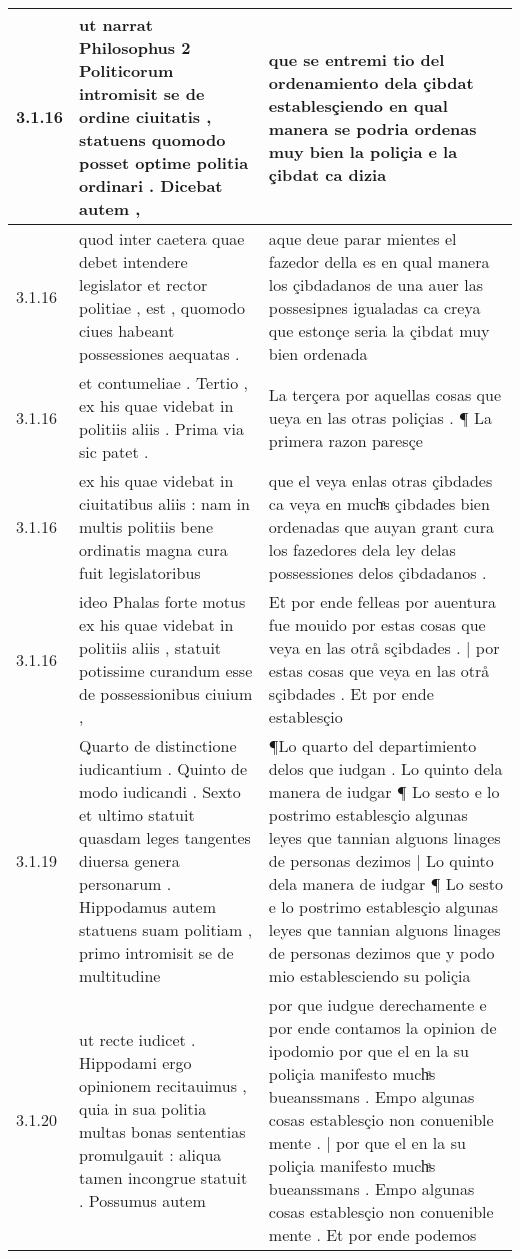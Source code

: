\begin{tabular}{|p{1cm}|p{6.5cm}|p{6.5cm}|}
3.1.16 & ut narrat Philosophus 2 Politicorum intromisit se de ordine ciuitatis , statuens quomodo posset optime politia ordinari . Dicebat autem , & que se entremi tio del ordenamiento dela çibdat establesçiendo en qual manera se podria ordenas muy bien la poliçia e la çibdat ca dizia \\\hline
3.1.16 & quod inter caetera quae debet intendere legislator et rector politiae , est , quomodo ciues habeant possessiones aequatas . & aque deue parar mientes el fazedor della es en qual manera los çibdadanos de una auer las possesipnes igualadas ca creya que estonçe seria la çibdat muy bien ordenada \\\hline
3.1.16 & et contumeliae . Tertio , ex his quae videbat in politiis aliis . Prima via sic patet . & La terçera por aquellas cosas que ueya en las otras poliçias . ¶ La primera razon paresçe \\\hline
3.1.16 & ex his quae videbat in ciuitatibus aliis : nam in multis politiis bene ordinatis magna cura fuit legislatoribus & que el veya enlas otras çibdades ca veya en muchͣs çibdades bien ordenadas que auyan grant cura los fazedores dela ley delas possessiones delos çibdadanos . \\\hline
3.1.16 & ideo Phalas forte motus ex his quae videbat in politiis aliis , statuit potissime curandum esse de possessionibus ciuium , & Et por ende felleas por auentura fue mouido por estas cosas que veya en las otrå sçibdades . | por estas cosas que veya en las otrå sçibdades . Et por ende establesçio \\\hline
3.1.19 & Quarto de distinctione iudicantium . Quinto de modo iudicandi . Sexto et ultimo statuit quasdam leges tangentes diuersa genera personarum . Hippodamus autem statuens suam politiam , primo intromisit se de multitudine & ¶Lo quarto del departimiento delos que iudgan . Lo quinto dela manera de iudgar ¶ Lo sesto e lo postrimo establesçio algunas leyes que tannian alguons linages de personas dezimos | Lo quinto dela manera de iudgar ¶ Lo sesto e lo postrimo establesçio algunas leyes que tannian alguons linages de personas dezimos que y podo mio establesciendo su poliçia \\\hline
3.1.20 & ut recte iudicet . Hippodami ergo opinionem recitauimus , quia in sua politia multas bonas sententias promulgauit : aliqua tamen incongrue statuit . Possumus autem & por que iudgue derechamente e por ende contamos la opinion de ipodomio por que el en la su poliçia manifesto muchͣs bueanssmans . Empo algunas cosas establesçio non conuenible mente . | por que el en la su poliçia manifesto muchͣs bueanssmans . Empo algunas cosas establesçio non conuenible mente . Et por ende podemos \\\hline

\end{tabular}
